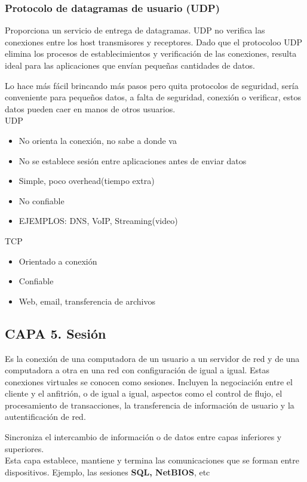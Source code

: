 \documentclass[letterpaper,12pt]{article}
\begin{document}
\begin{sloppypar}
\subsubsection{Protocolo de datagramas de usuario (UDP)}
Proporciona un servicio de entrega de datagramas. UDP no verifica las conexiones entre los host transmisores y receptores. Dado que el protocoloo UDP elimina los procesos de establecimientos y verificación de las conexiones, resulta ideal para las aplicaciones que envían pequeñas cantidades de datos.

Lo hace más fácil brincando más pasos pero quita protocolos de seguridad, sería conveniente para pequeños datos, a falta de seguridad, conexión o verificar, estos datos pueden caer en manos de otros usuarios.
\vspace{0.3cm}\\ 
UDP
\begin{itemize}
    \item No orienta la conexión, no sabe a donde va
    \item No se establece sesión entre aplicaciones antes de enviar datos
    \item Simple, poco overhead(tiempo extra)
    \item No confiable 
    \item EJEMPLOS: DNS, VoIP, Streaming(video)
\end{itemize}
TCP
\begin{itemize}
    \item Orientado a conexión 
    \item Confiable
    \item Web, email, transferencia de archivos
\end{itemize}

\subsection{CAPA 5. Sesión}
Es la conexión de una computadora de un usuario a un servidor de red y de una computadora a otra en una red con configuración de igual a igual. Estas conexiones virtuales se conocen como sesiones. Incluyen la negociación entre el cliente y el anfitrión, o de igual a igual, aspectos como el control de flujo, el procesamiento de transacciones, la transferencia de información de usuario y la autentificación de red.

Sincroniza el intercambio de información o de datos entre capas inferiores y superiores.
\vspace{0.3cm}\\ 
Esta capa establece, mantiene y termina las comunicaciones que se forman entre dispositivos.
Ejemplo, las sesiones \textbf{SQL, NetBIOS}, etc


\end{sloppypar}
\end{document}
